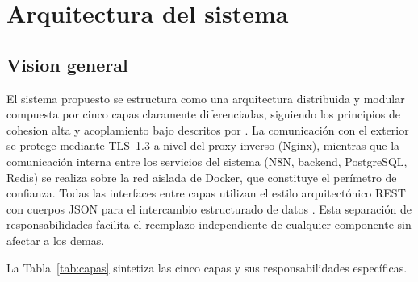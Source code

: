 \section{Arquitectura del sistema}

\subsection{Vision general}

El sistema propuesto se estructura como una arquitectura distribuida y modular compuesta por cinco capas claramente diferenciadas, siguiendo los principios de cohesion alta y acoplamiento bajo descritos por \textcite{Pressman2020_software_engineering}. La comunicación con el exterior se protege mediante TLS~1.3 a nivel del proxy inverso (Nginx), mientras que la comunicación interna entre los servicios del sistema (N8N, backend, PostgreSQL, Redis) se realiza sobre la red aislada de Docker, que constituye el perímetro de confianza. Todas las interfaces entre capas utilizan el estilo arquitectónico REST con cuerpos JSON para el intercambio estructurado de datos \parencite{Fielding2002_rest}. Esta separación de responsabilidades facilita el reemplazo independiente de cualquier componente sin afectar a los demas.

La Tabla~\ref{tab:capas} sintetiza las cinco capas y sus responsabilidades específicas.

